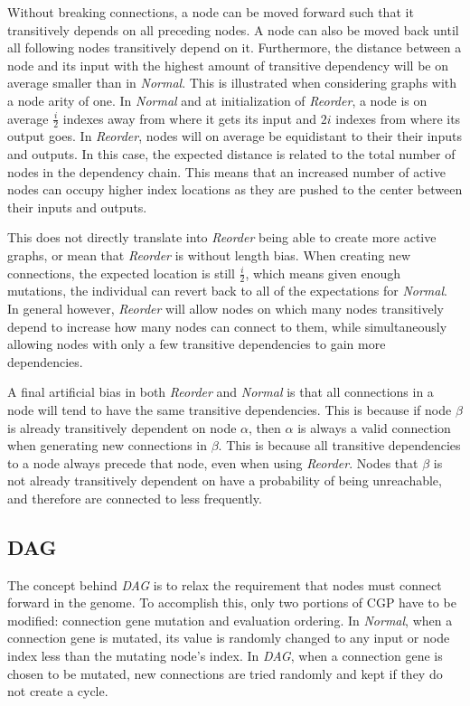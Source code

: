 \documentclass{sig-alternate}
\begin{document}
Without breaking connections, a node can be moved forward such that
it transitively depends on all preceding nodes.  A node can also be moved back until all following nodes
transitively depend on it.  Furthermore, the distance between a node and
its input with the highest amount of transitive dependency will be on average smaller
than in \emph{Normal}.  This is illustrated
when considering graphs with a node arity of one.  In \emph{Normal} and at initialization
of \emph{Reorder}, a node is on average $\frac{i}{2}$ indexes away from where it gets its input and $2i$ indexes
from where its output goes.  In \emph{Reorder}, nodes will on average be equidistant to
their their inputs and outputs.  In this case, the expected distance is related to the total number
of nodes in the dependency chain.  This means that an increased number of active nodes can
occupy higher index locations as they are pushed to the center between their inputs and outputs.

This does not directly translate into \emph{Reorder} being able to create more active graphs,
or mean that \emph{Reorder} is without length bias.  When creating new connections,
the expected location is still $\frac{i}{2}$, which means given enough mutations,
the individual can revert back to all of the expectations for \emph{Normal}.
In general however, \emph{Reorder} will allow nodes on which
many nodes transitively depend to increase how many nodes can connect to them, while simultaneously
allowing nodes with only a few transitive dependencies to gain more dependencies.

A final artificial bias in both \emph{Reorder} and \emph{Normal} is
that all connections in a node will tend to have the same transitive
dependencies.  This is because if node $\beta$ is already transitively dependent
on node $\alpha$, then $\alpha$ is always a valid connection when generating new connections in $\beta$.
This is because all transitive dependencies to a node always precede that node, even
when using \emph{Reorder}.  Nodes that $\beta$ is not already transitively dependent
on have a probability of being unreachable, and therefore are connected to less frequently.

\subsection{DAG}
\label{sec-dag}
The concept behind \emph{DAG} is to relax the requirement that nodes must connect
forward in the genome.
To accomplish this, only two portions of CGP have to be
modified: connection gene mutation and evaluation ordering.
In \emph{Normal}, when a connection gene is mutated, its value is randomly changed
to any input or node index less than the mutating node's index.  In
\emph{DAG}, when a connection gene is chosen to be mutated, new connections are
tried randomly and kept if they do not create a cycle.
\end{document}
